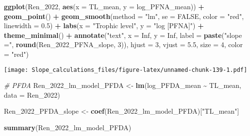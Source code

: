\documentclass[
]{article}
\newenvironment{Shaded}{\begin{snugshade}}{\end{snugshade}}
\newcommand{\AttributeTok}[1]{\textcolor[rgb]{0.13,0.29,0.53}{#1}}
\newcommand{\CommentTok}[1]{\textcolor[rgb]{0.56,0.35,0.01}{\textit{#1}}}
\newcommand{\ConstantTok}[1]{\textcolor[rgb]{0.56,0.35,0.01}{#1}}
\newcommand{\DecValTok}[1]{\textcolor[rgb]{0.00,0.00,0.81}{#1}}
\newcommand{\FloatTok}[1]{\textcolor[rgb]{0.00,0.00,0.81}{#1}}
\newcommand{\FunctionTok}[1]{\textcolor[rgb]{0.13,0.29,0.53}{\textbf{#1}}}
\newcommand{\NormalTok}[1]{#1}
\newcommand{\OtherTok}[1]{\textcolor[rgb]{0.56,0.35,0.01}{#1}}
\newcommand{\SpecialCharTok}[1]{\textcolor[rgb]{0.81,0.36,0.00}{\textbf{#1}}}
\newcommand{\StringTok}[1]{\textcolor[rgb]{0.31,0.60,0.02}{#1}}
\begin{document}
\begin{Shaded}
\begin{Highlighting}[]
\FunctionTok{ggplot}\NormalTok{(Ren\_2022, }\FunctionTok{aes}\NormalTok{(}\AttributeTok{x =}\NormalTok{ TL\_mean, }\AttributeTok{y =}\NormalTok{ log\_PFNA\_mean)) }\SpecialCharTok{+}
  \FunctionTok{geom\_point}\NormalTok{() }\SpecialCharTok{+}
  \FunctionTok{geom\_smooth}\NormalTok{(}\AttributeTok{method =} \StringTok{"lm"}\NormalTok{, }\AttributeTok{se =} \ConstantTok{FALSE}\NormalTok{, }\AttributeTok{color =} \StringTok{"red"}\NormalTok{, }\AttributeTok{linewidth =} \FloatTok{0.5}\NormalTok{) }\SpecialCharTok{+}
  \FunctionTok{labs}\NormalTok{(}\AttributeTok{x =} \StringTok{"Trophic level"}\NormalTok{,}
       \AttributeTok{y =} \StringTok{"log [PFNA]"}\NormalTok{) }\SpecialCharTok{+}
  \FunctionTok{theme\_minimal}\NormalTok{() }\SpecialCharTok{+}
  \FunctionTok{annotate}\NormalTok{(}\StringTok{"text"}\NormalTok{, }\AttributeTok{x =} \ConstantTok{Inf}\NormalTok{, }\AttributeTok{y =} \ConstantTok{Inf}\NormalTok{, }\AttributeTok{label =} \FunctionTok{paste}\NormalTok{(}\StringTok{"slope ="}\NormalTok{, }\FunctionTok{round}\NormalTok{(Ren\_2022\_PFNA\_slope, }\DecValTok{3}\NormalTok{)), }
           \AttributeTok{hjust =} \DecValTok{3}\NormalTok{, }\AttributeTok{vjust =} \FloatTok{5.5}\NormalTok{, }\AttributeTok{size =} \DecValTok{4}\NormalTok{, }\AttributeTok{color =} \StringTok{"red"}\NormalTok{)}
\end{Highlighting}
\end{Shaded}

\texttt{[image: Slope\_calculations\_files/figure-latex/unnamed-chunk-139-1.pdf]}

\begin{Shaded}
\begin{Highlighting}[]
\CommentTok{\# PFDA}
\NormalTok{Ren\_2022\_lm\_model\_PFDA }\OtherTok{\textless{}{-}} \FunctionTok{lm}\NormalTok{(log\_PFDA\_mean }\SpecialCharTok{\textasciitilde{}}\NormalTok{ TL\_mean,}
                              \AttributeTok{data =}\NormalTok{ Ren\_2022)}

\NormalTok{Ren\_2022\_PFDA\_slope }\OtherTok{\textless{}{-}} \FunctionTok{coef}\NormalTok{(Ren\_2022\_lm\_model\_PFDA)[}\StringTok{"TL\_mean"}\NormalTok{]}

\FunctionTok{summary}\NormalTok{(Ren\_2022\_lm\_model\_PFDA)}
\end{Highlighting}
\end{Shaded}
\end{document}
